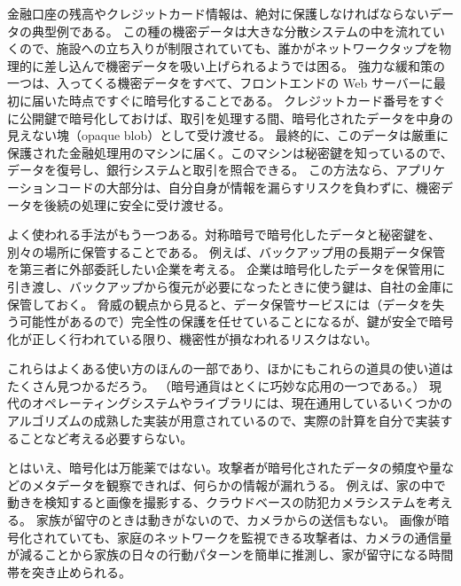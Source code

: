 \documentclass[uplatex]{jsarticle}
\def\label#1{}%
\begin{document}
\begin{exa}[受信直後の機密データの暗号化]\label{exa:ch5-encrypt-on-arrival}
金融口座の残高やクレジットカード情報は、絶対に保護しなければならないデータの典型例である。
この種の機密データは大きな分散システムの中を流れていくので、施設への立ち入りが制限されていても、誰かがネットワークタップを物理的に差し込んで機密データを吸い上げられるようでは困る。
強力な緩和策の一つは、入ってくる機密データをすべて、フロントエンドの Web サーバーに最初に届いた時点ですぐに暗号化することである。
クレジットカード番号をすぐに公開鍵で暗号化しておけば、取引を処理する間、暗号化されたデータを中身の見えない塊（opaque blob）として受け渡せる。
最終的に、このデータは厳重に保護された金融処理用のマシンに届く。このマシンは秘密鍵を知っているので、データを復号し、銀行システムと取引を照合できる。
この方法なら、アプリケーションコードの大部分は、自分自身が情報を漏らすリスクを負わずに、機密データを後続の処理に安全に受け渡せる。
\end{exa}

\begin{exa}[暗号化データと鍵の分離保管]\label{exa:ch5-separate-key-storage}
よく使われる手法がもう一つある。対称暗号で暗号化したデータと秘密鍵を、別々の場所に保管することである。
例えば、バックアップ用の長期データ保管を第三者に外部委託したい企業を考える。
企業は暗号化したデータを保管用に引き渡し、バックアップから復元が必要になったときに使う鍵は、自社の金庫に保管しておく。
脅威の観点から見ると、データ保管サービスには（データを失う可能性があるので）完全性の保護を任せていることになるが、鍵が安全で暗号化が正しく行われている限り、機密性が損なわれるリスクはない。
\end{exa}

これらはよくある使い方のほんの一部であり、ほかにもこれらの道具の使い道はたくさん見つかるだろう。
（暗号通貨はとくに巧妙な応用の一つである。）
現代のオペレーティングシステムやライブラリには、現在通用しているいくつかのアルゴリズムの成熟した実装が用意されているので、実際の計算を自分で実装することなど考える必要すらない。

\begin{exa}[暗号化しても漏れるメタデータ]\label{exa:ch5-metadata-leak}
とはいえ、暗号化は万能薬ではない。攻撃者が暗号化されたデータの頻度や量などのメタデータを観察できれば、何らかの情報が漏れうる。
例えば、家の中で動きを検知すると画像を撮影する、クラウドベースの防犯カメラシステムを考える。
家族が留守のときは動きがないので、カメラからの送信もない。
画像が暗号化されていても、家庭のネットワークを監視できる攻撃者は、カメラの通信量が減ることから家族の日々の行動パターンを簡単に推測し、家が留守になる時間帯を突き止められる。
\end{exa}
\end{document}
